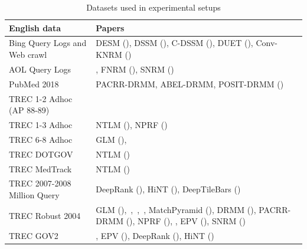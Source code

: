 {
\renewcommand{\arraystretch}{1.5}
\begin{table}
    \centering
    \small
    \caption{Datasets used in experimental setups}
    \begin{tabular}{lL{25em}}
    \toprule
        English data & Papers \\
        \midrule
        
        Bing Query Logs and Web crawl & DESM (\cite{Mitra2016a, Nalisnick:2016}), DSSM (\cite{dssm13}), C-DSSM (\cite{Shen2014a, Shen2014b}), DUET (\cite{Mitra2017a}), Conv-KNRM (\cite{ConvKNRM18})\\
        
        AOL Query Logs & \cite{Nie_ictir18, Nie_sigir_2018}, FNRM (\cite{Dehghani_sigir17}), SNRM (\cite{Zamani_neural_reranking_2018})\\
        
        PubMed 2018 & PACRR-DRMM, ABEL-DRMM, POSIT-DRMM (\cite{pacrr_drmm_18})\\
        
        TREC 1-2 Adhoc (AP 88-89) & \citet{Zamani_16a}\\
        
        TREC 1-3 Adhoc & NTLM (\cite{Zuccon15}), NPRF (\cite{li2018nprf})\\
        
        TREC 6-8 Adhoc & GLM (\cite{Ganguly_GLM15}),~\cite{RoyGMJ16}\\
        
        TREC DOTGOV & NTLM (\cite{Zuccon15})\\
        
        TREC MedTrack & NTLM (\cite{Zuccon15})\\
        
        TREC 2007-2008 Million Query & DeepRank (\cite{Pang_deeprank_2017}), HiNT (\cite{Fan_hint_2018}), DeepTileBars (\cite{deeptilebars_2019})\\
        
        TREC Robust 2004 & GLM (\cite{Ganguly_GLM15}),~\cite{RoyGMJ16},~\cite{Zamani_16a},~\cite{diaz16}, MatchPyramid (\cite{matchpyramid16}), DRMM (\cite{Guo2016}), PACRR-DRMM (\cite{pacrr_drmm_18}), NPRF (\cite{li2018nprf}), \cite{Dehghani_sigir17, dehghani2018fidelityweighted, dehghani_nips17}, EPV (\cite{Ai2016a, Ai2016b}), SNRM (\cite{Zamani_neural_reranking_2018})\\
        
        TREC GOV2 & \cite{Zamani_16a}, EPV (\cite{Ai2016a, Ai2016b}), DeepRank (\cite{Pang_deeprank_2017}), HiNT (\cite{Fan_hint_2018})\\
        

\end{tabular}
\end{table}}

